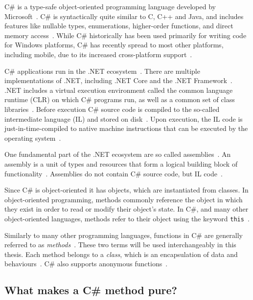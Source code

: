 \documentclass[a4paper,12pt]{article}
\begin{document}
C\# is a type-safe object-oriented programming language developed by Microsoft~\cite{albahari2003nutshell}. C\# is syntactically quite similar to C, C++ and Java, and includes features like nullable types, enumerations, higher-order functions, and direct memory access~\cite{intro-to-Csharp}. While C\# historically has been used primarily for writing code for Windows platforms, C\# has recently spread to most other platforms, including mobile, due to its increased cross-platform support~\cite{albahari2003nutshell}.

C\# applications run in the .NET ecosystem~\cite{intro-to-Csharp}. There are multiple implementations of .NET, including .NET Core and the .NET Framework~\cite{intro-to-Csharp}. .NET includes a virtual execution environment called the common language runtime (CLR) on which C\# programs run, as well as a common set of class libraries~\cite{albahari2003nutshell}. Before execution C\# source code is compiled to the so-called intermediate language (IL) and stored on disk~\cite{intro-to-Csharp}. Upon execution, the IL code is just-in-time-compiled to native machine instructions that can be executed by the operating system~\cite{intro-to-Csharp}.

One fundamental part of the .NET ecosystem are so called assemblies~\cite{assemblies}. An assembly is a unit of types and resources that form a logical building block of functionality~\cite{assemblies}. Assemblies do not contain C\# source code, but IL code~\cite{assemblies-overview}.

Since C\# is object-oriented it has objects, which are instantiated from classes. In object-oriented programming, methods commonly reference the object in which they exist in order to read or modify their object's state. In C\#, and many other object-oriented languages, methods refer to their object using the keyword \texttt{this}~\cite{microsoft-this}.

Similarly to many other programming languages, functions in C\# are generally referred to as \textit{methods}~\cite{albahari2003nutshell}. These two terms will be used interchangeably in this thesis. Each method belongs to a \textit{class}, which is an encapsulation of data and behaviours~\cite{albahari2003nutshell}. C\# also supports anonymous functions~\cite{albahari2003nutshell}.

\subsection{What makes a C\# method pure?} \label{sub:What makes a Cs program functional?}
\end{document}
